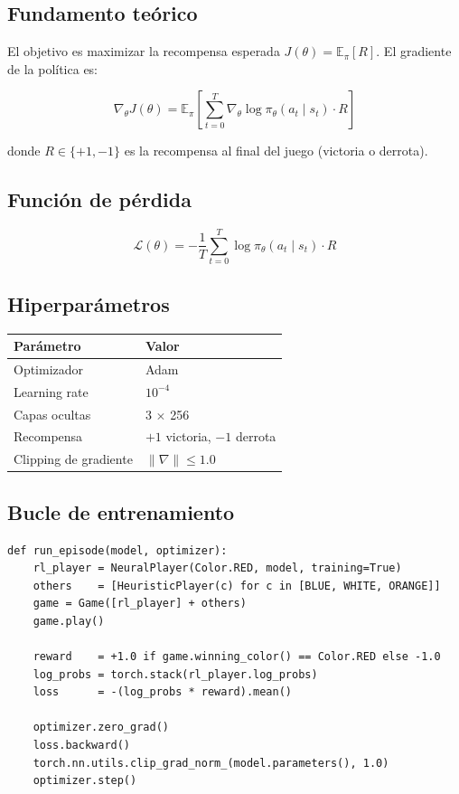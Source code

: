 \documentclass[11pt, a4paper]{article}
\begin{document}
\subsection{Fundamento teórico}

El objetivo es maximizar la recompensa esperada $J(\theta) = \mathbb{E}_\pi[R]$.
El gradiente de la política es:

\[
  \nabla_\theta J(\theta) = \mathbb{E}_\pi \left[
    \sum_{t=0}^{T} \nabla_\theta \log \pi_\theta(a_t \mid s_t) \cdot R
  \right]
\]

donde $R \in \{+1, -1\}$ es la recompensa al final del juego (victoria o derrota).

\subsection{Función de pérdida}

\[
  \mathcal{L}(\theta) = -\frac{1}{T} \sum_{t=0}^{T} \log \pi_\theta(a_t \mid s_t) \cdot R
\]

\subsection{Hiperparámetros}

\begin{center}
\begin{tabular}{ll}
  \toprule
  \textbf{Parámetro} & \textbf{Valor} \\
  \midrule
  Optimizador        & Adam           \\
  Learning rate      & $10^{-4}$      \\
  Capas ocultas      & 3 $\times$ 256 \\
  Recompensa         & $+1$ victoria, $-1$ derrota \\
  Clipping de gradiente & $\|\nabla\| \leq 1.0$ \\
  \bottomrule
\end{tabular}
\end{center}

\subsection{Bucle de entrenamiento}

\begin{lstlisting}[caption={Episodio de entrenamiento simplificado}]
def run_episode(model, optimizer):
    rl_player = NeuralPlayer(Color.RED, model, training=True)
    others    = [HeuristicPlayer(c) for c in [BLUE, WHITE, ORANGE]]
    game = Game([rl_player] + others)
    game.play()

    reward    = +1.0 if game.winning_color() == Color.RED else -1.0
    log_probs = torch.stack(rl_player.log_probs)
    loss      = -(log_probs * reward).mean()

    optimizer.zero_grad()
    loss.backward()
    torch.nn.utils.clip_grad_norm_(model.parameters(), 1.0)
    optimizer.step()
\end{lstlisting}
\end{document}

